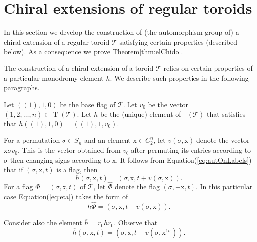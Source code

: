 \documentclass[final]{amsart}
\theoremstyle{plain}
\theoremstyle{definition}
\theoremstyle{remark}
\numberwithin{equation}{section}
\renewcommand{\{}{\lbrace}
\renewcommand{\}}{\rbrace}
\renewcommand{\bar}{\overline}
\renewcommand{\hat}{\widehat}
\newcommand{\cT}{\mathcal{T}}
\newcommand{\cyvec}[1]{{\mathrm{#1}}}
\newcommand{\vx}{\cyvec{x}}
\DeclareMathOperator{\mon}{Mon}
\DeclareMathOperator{\monp}{\mon^{+}}
\newcommand{\cyctwo}[1][n]{ C_{2}^{#1} }
\DeclareMathOperator{\tras}{T}
\newcommand{\kng}{{h}}
\begin{document}
 \section{Chiral extensions of regular toroids}\label{sec:chirExtRegToroids}

In this section we develop the construction of (the automorphism group of) a chiral extension of a regular toroid $\cT$ satisfying certain properties (described below).
As a consequence we prove Theorem\nobreakspace \ref {thm:elChido}.


The construction of a chiral extension of a toroid $\cT$ relies on certain properties of a particular monodromy element $\kng$.
We describe such properties in the following paragraphs.

Let $((1), \cyvec{1},0)$ be the base flag of $\cT$.
Let $v_{0}$ 
be the vector $(1,2,\dots,n) \in \tras(\cT)$.
Let $\kng$ be the (unique) element of $\monp(\cT)$ that satisfies that $\kng ((1), \cyvec{1},0) = ( (1), \cyvec{1}, v_{0})$.

For a permutation $\sigma \in S_{n}$ and an element $\vx \in \cyctwo$, let $v(\sigma, \vx)$ denote the vector $\vx \sigma  v_{0}$. This is the vector obtained from $v_{0}$ after permuting its entries according to $\sigma$ then changing signs according to $\vx$. It follows from Equation\nobreakspace \textup {(\ref {eq:autOnLabels})} that if $(\sigma, \vx,  t)$ is a flag, then
\begin{equation} \label{eq:eta}
  \kng(\sigma, \vx,  t) = \left(\sigma, \vx,  t + v(\sigma, \vx)\right).
\end{equation}
For a flag $\Phi = (\sigma, \vx, t)$ of $\cT$, let $\hat{\Phi}$ denote the flag $(\sigma, -\vx, t)$.
In this particular case Equation\nobreakspace \textup {(\ref {eq:eta})} takes the form of
\begin{equation}\label{eq:antipoda}
\kng \hat{\Phi} = (\sigma, \vx, t - v(\sigma, \vx)).
\end{equation}


Consider also the element $\bar{\kng} = r_{0} \kng r_{0}$.
Observe that
\begin{equation} \label{eq:etaBar}
\bar{\kng}(\sigma, \vx,  t) = \left(\sigma, \vx,  t + v(\sigma, \vx^{1 \sigma})\right).
\end{equation}
\end{document}
